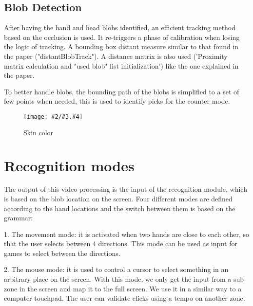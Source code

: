 \documentclass{llncs}
\newcommand\ignore[1]{}
\newcommand{\imagepathext}[5]{%
\begin{figure}[hbtp]
\hfil\texttt{[image: \#2/\#3.\#4]}\hfil
\caption{#5\label{#3}}
\end{figure}}
\newcommand{\png}[2]{\imagepathext{width=\columnwidth}{pics}{#1}{png}{#2}}
\begin{document}
\subsection{Blob Detection}
After having the hand and head blobs identified, an efficient tracking method based on the occlusion is used. It re-triggers a phase of calibration when losing the logic of tracking.
A bounding box distant measure similar to that found in the paper \cite{app06} ("distantBlobTrack"). A distance matrix is also used ('Proximity matrix calculation and "used blob" list initialization') like the one explained in the paper. 
\ignore{
When the matrix of distance is set up, there are some loops:
* A loop for detect inactive tracks: those tracks with no blobs near.
* Detect and create new tracks: those blobs without a track near.
* A loop to assign blobs to tracks. It makes clusters with blobs that are close and assign them to a track. In this step some tracks could merge in one.
* At the end, all inactive tracks are checked to delete the old ones.
}
To better handle blobs, the bounding path of the blobs is simplified to a set of few points when needed, this is used to identify picks for the counter mode.

\png{skincolor}{Skin color}

\ignore{
\section{Simplified gesture generation}
Using these blocks we are able to perturb
}

\section{Recognition modes}
The output of this video processing is the input of the recognition module, which is based on the blob location on the screen. Four different modes are defined according to the hand locations and the switch between them is based on the grammar:

1. The movement mode:
it is activated when two hands are close to each other, so that the user selects between 4 directions. This mode can be used as input for games to select between the directions.

2. The mouse mode:
it is used to control a cursor to select something in an arbitrary place on the screen. With this mode, we only get the input from a sub zone in the screen and map it to the full screen. We use it in a similar way to a computer touchpad.
The user can validate clicks using a tempo on another zone.
\end{document}
